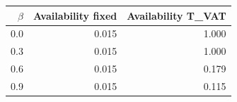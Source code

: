 \begin{tabular}{rrr}
\hline
$\beta$ & Availability fixed & Availability T\_VAT \\
\hline
0.0 & 0.015 & 1.000 \\
0.3 & 0.015 & 1.000 \\
0.6 & 0.015 & 0.179 \\
0.9 & 0.015 & 0.115 \\
\hline
\end{tabular}

